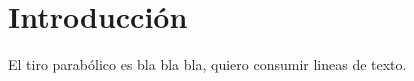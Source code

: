 \section{Introducción}
\label{sec:introduccion}



El tiro parabólico es bla bla bla, quiero consumir lineas de texto.


